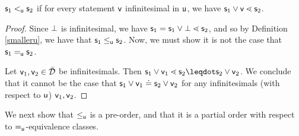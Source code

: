 \documentclass[11pt]{article}
\begin{document}
 \begin{prop}
$\stmt_1 \leu \stmt_2$ if for every statement $\stmt[v]$ infinitesimal in $\stmt[u]$, we have $\stmt_1\OR\stmt[v] \sfiner \stmt_2$. 
\end{prop}
\begin{proof}
Since $\impossibility$ is infinitesimal, we have $\stmt_1 = \stmt_1\OR\impossibility \sfiner \stmt_2$, and so by Definition \ref{smalleru}, we have that $\stmt_1\lequ\stmt_2$. Now, we must show it is not the case that $\stmt_1\equ \stmt_2$. 

Let $\stmt[v]_1,\stmt[v]_2\in\tdomain$ be infinitesimals. Then $\stmt_1\OR\stmt[v]_1 \sfiner \stmt_2 \finer\stmt_2\OR\stmt[v]_2$. We conclude that it cannot be the case that $\stmt_1 \OR \stmt[v]_1 \eqgran \stmt_2 \OR \stmt[v]_2$ for any infinitesimals (with respect to $\stmt[u]$) $\stmt[v]_1,\stmt[v]_2$. 
\end{proof}

We next show that $\lequ$ is a pre-order, and that it is a partial order with respect to $\equ$-equivalence classes. 
\end{document}
